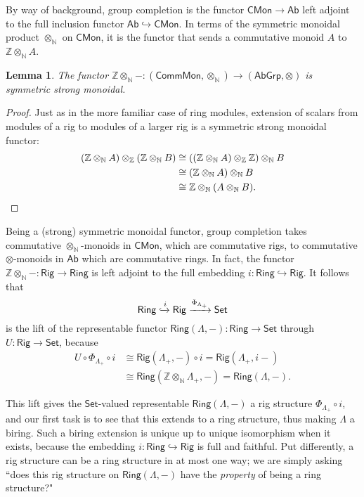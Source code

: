 \documentclass[12pt,reqno]{amsart}
\theoremstyle{plain}
\newtheorem{lem}[thm]{Lemma}
\theoremstyle{definition}
\theoremstyle{remark}
\newcommand{\maps}{\colon}
\newcommand{\N}{\mathbb N}
\newcommand{\Z}{\mathbb Z}
\newcommand{\namedcat}[1]{\mathsf{#1}}
\newcommand{\Ab}{\namedcat{Ab}}
\newcommand{\Comm}{\namedcat{Comm}}
\newcommand{\Grp}{\namedcat{Grp}}
\newcommand{\Mon}{\namedcat{Mon}}
\newcommand{\CMon}{\namedcat{CMon}}
\newcommand{\Rig}{\namedcat{Rig}}
\newcommand{\Ring}{\namedcat{Ring}}
\newcommand{\Set}{\namedcat{Set}}
\numberwithin{thm}{section}
\begin{document}
By way of background, group completion is the functor $
\CMon \to \Ab$ left adjoint to the full inclusion functor $\Ab \hookrightarrow \CMon$. In terms of the symmetric monoidal product $\otimes_\N$ on $\CMon$, it is the functor that sends a commutative monoid $A$ to $\Z \otimes_\N A$.

\begin{lem}
The functor $\Z\otimes_\N - \maps (\Comm\Mon, \otimes_\N) \to (\Ab\Grp, \otimes)$ is symmetric strong monoidal.
\end{lem}

\begin{proof}  
    Just as in the more familiar case of ring modules, extension of scalars from modules of a rig to modules of a larger rig is a symmetric strong monoidal functor:
    \begin{align*} 
        (\Z \otimes_\N A) \otimes_\Z (\Z \otimes_\N B) 
        &\cong ((\Z \otimes_\N A) \otimes_\Z \Z) \otimes_\N B 
        \\&\cong (\Z \otimes_\N A) \otimes_\N B 
        \\&\cong  \Z \otimes_\N (A \otimes_\N B). \qedhere
    \end{align*}
\end{proof}
Being a (strong) symmetric monoidal functor, group completion takes commutative $\otimes_\N$-monoids in $\CMon$, which are commutative rigs, to commutative $\otimes$-monoids in $\Ab$ which are commutative rings. In fact, the functor $\Z \otimes_\N - \maps \Rig \to \Ring$ is left adjoint to the full embedding $i \maps \Ring \hookrightarrow \Rig$. It follows that 
\[
\Ring \xhookrightarrow{i} \Rig \xrightarrow{\Phi_{\Lambda_+}} \Set
\]
is the lift of the representable functor $\Ring(\Lambda, -) \maps \Ring \to \Set$ through $U \maps \Rig \to \Set$, because 
\begin{align*} 
    U \circ \Phi_{\Lambda_+} \circ i 
    &\cong \Rig(\Lambda_+, -) \circ i 
    = \Rig(\Lambda_+, i-) 
    \\&\cong \Ring(\Z \otimes_\N \Lambda_+, -) 
    = \Ring(\Lambda, -).
\end{align*}

This lift gives the $\Set$-valued representable $\Ring(\Lambda, -)$ a rig structure $\Phi_{\Lambda_+} \circ i$, and our first task is to see that this extends to a ring structure, thus making $\Lambda$ a biring. Such a biring extension is unique up to unique isomorphism when it exists, because the embedding $i \maps \Ring \hookrightarrow \Rig$ is full and faithful. Put differently, a rig structure can be a ring structure in at most one way; we are simply asking ``does this rig structure on $\Ring(\Lambda, -)$ have the \emph{property} of being a ring structure?"
\end{document}

